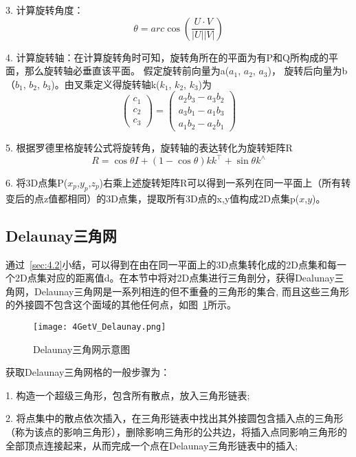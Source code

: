 3. 计算旋转角度：
\begin{equation}
\theta=arc\cos(\frac{U\cdot V}{\left|U\right|\left|V\right|})
\end{equation}

4. 计算旋转轴：在计算旋转角时可知，旋转角所在的平面为有P和Q所构成的平面，那么旋转轴必垂直该平面。
假定旋转前向量为a($a_1$, $a_2$, $a_3$)， 旋转后向量为b（$b_1$, $b_2$, $b_3$)。由叉乘定义得旋转轴k($k_1$, $k_2$, $k_3$)为
\begin{equation}
\begin{pmatrix}c_1\\c_2\\c_3\end{pmatrix}=\begin{pmatrix}a_2b_3-a_3b_2\\a_3b_1-a_1b_3\\a_1b_2-a_2b_1\end{pmatrix}
\end{equation}

5. 根据罗德里格旋转公式将旋转角，旋转轴的表达转化为旋转矩阵R
\begin{equation}R=\cos \theta I+(1-\cos \theta) k k^{\top}+\sin \theta k^{\wedge}\end{equation}

6. 将3D点集P($x_p$,$y_p$,$z_p$)右乘上述旋转矩阵R可以得到一系列在同一平面上（所有转变后的点z值都相同）的3D点集，提取所有3D点的x,y值构成2D点集p($x$,$y$)。
\subsection{Delaunay三角网}
\label{sec:4.4.3}
通过~\ref{sec:4.2}小结，可以得到在由在同一平面上的3D点集转化成的2D点集和每一个2D点集对应的距离值d。在本节中将对2D点集进行三角剖分，获得Dealunay三角网，Delaunay三角网是一系列相连的但不重叠的三角形的集合, 而且这些三角形的外接圆不包含这个面域的其他任何点，如图~\ref{fig:4GetV_Delaunay}所示。
\begin{figure}[H] %
  \centering
  \texttt{[image: 4GetV\_Delaunay.png]}
  \caption{Delaunay三角网示意图}
  \label{fig:4GetV_Delaunay}
\end{figure}
获取Delaunay三角网格的一般步骤为： 

1. 构造一个超级三角形，包含所有散点，放入三角形链表;

2. 将点集中的散点依次插入，在三角形链表中找出其外接圆包含插入点的三角形（称为该点的影响三角形），删除影响三角形的公共边，将插入点同影响三角形的全部顶点连接起来，从而完成一个点在Delaunay三角形链表中的插入;

